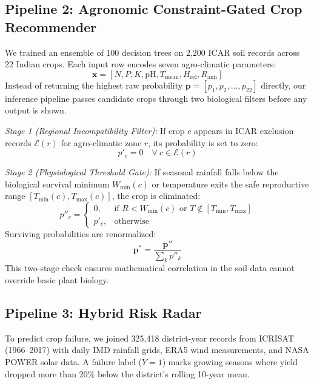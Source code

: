\documentclass[conference]{IEEEtran}
\begin{document}
\subsection{Pipeline 2: Agronomic Constraint-Gated Crop Recommender}
\label{sec:pipeline2}
We trained an ensemble of 100 decision trees on 2,200 ICAR soil records across 22 Indian crops. Each input row encodes seven agro-climatic parameters:
\begin{equation}
\mathbf{x} = [N, P, K, \text{pH}, T_{\text{mean}}, H_{\text{rel}}, R_{\text{ann}}]
\end{equation}
Instead of returning the highest raw probability $\mathbf{p} = [p_1, p_2, \ldots, p_{22}]$ directly, our inference pipeline passes candidate crops through two biological filters before any output is shown.

\textit{Stage 1 (Regional Incompatibility Filter):} If crop $c$ appears in ICAR exclusion records $\mathcal{E}(r)$ for agro-climatic zone $r$, its probability is set to zero:
\begin{equation}
p'_c = 0 \quad \forall \ c \in \mathcal{E}(r)
\end{equation}

\textit{Stage 2 (Physiological Threshold Gate):} If seasonal rainfall falls below the biological survival minimum $W_{\min}(c)$ or temperature exits the safe reproductive range $[T_{\min}(c), T_{\max}(c)]$, the crop is eliminated:
\begin{equation}
p''_c = \begin{cases}
0, & \text{if } R < W_{\min}(c) \text{ or } T \notin [T_{\min}, T_{\max}] \\
p'_c, & \text{otherwise}
\end{cases}
\end{equation}
Surviving probabilities are renormalized:
\begin{equation}
\mathbf{p}^* = \frac{\mathbf{p}''}{\sum_k p''_k}
\end{equation}
This two-stage check ensures mathematical correlation in the soil data cannot override basic plant biology.

\subsection{Pipeline 3: Hybrid Risk Radar}
To predict crop failure, we joined 325,418 district-year records from ICRISAT (1966--2017) with daily IMD rainfall grids, ERA5 wind measurements, and NASA POWER solar data. A failure label ($Y=1$) marks growing seasons where yield dropped more than 20\% below the district's rolling 10-year mean.
\end{document}
